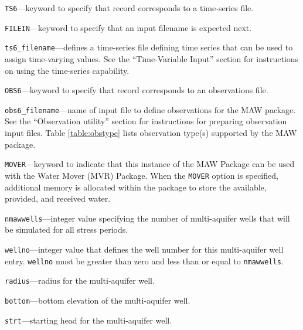 \item \texttt{TS6}---keyword to specify that record corresponds to a time-series file.

\item \texttt{FILEIN}---keyword to specify that an input filename is expected next.

\item \texttt{ts6\_filename}---defines a time-series file defining time series that can be used to assign time-varying values. See the ``Time-Variable Input'' section for instructions on using the time-series capability.

\item \texttt{OBS6}---keyword to specify that record corresponds to an observations file.

\item \texttt{obs6\_filename}---name of input file to define observations for the MAW package. See the ``Observation utility'' section for instructions for preparing observation input files. Table \ref{table:obstype} lists observation type(s) supported by the MAW package.

\item \texttt{MOVER}---keyword to indicate that this instance of the MAW Package can be used with the Water Mover (MVR) Package.  When the \texttt{MOVER} option is specified, additional memory is allocated within the package to store the available, provided, and received water.

\item \texttt{nmawwells}---integer value specifying the number of multi-aquifer wells that will be simulated for all stress periods.

\item \texttt{wellno}---integer value that defines the well number for this multi-aquifer well entry. \texttt{wellno} must be greater than zero and less than or equal to \texttt{nmawwells}.

\item \texttt{radius}---radius for the multi-aquifer well.

\item \texttt{bottom}---bottom elevation of the multi-aquifer well.

\item \texttt{strt}---starting head for the multi-aquifer well.

